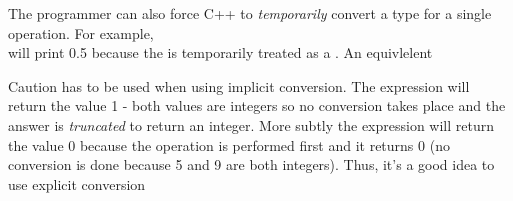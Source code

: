 The programmer can also force C++ to \emph{temporarily} convert a type for a single operation.  For example,\\
will print 0.5 because the  is temporarily treated as a .  An equivlelent 

Caution has to be used when using implicit conversion.   The expression  will return the value 1 - both values are integers so no conversion takes place and the answer is \emph{truncated} to return an integer.  More subtly the expression  will return the value 0 because the operation  is performed first and it returns 0 (no conversion is done because 5 and 9 are both integers).  Thus, it's a good idea to use explicit conversion

